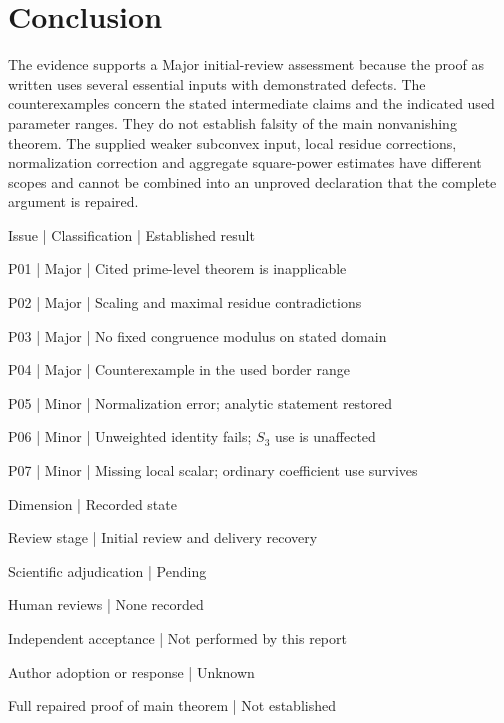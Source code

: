 \documentclass[10pt]{article}
\begin{document}
\section*{Conclusion}
The evidence supports a Major initial-review assessment because the proof as written uses several essential inputs with demonstrated defects. The counterexamples concern the stated intermediate claims and the indicated used parameter ranges. They do not establish falsity of the main nonvanishing theorem. The supplied weaker subconvex input, local residue corrections, normalization correction and aggregate square-power estimates have different scopes and cannot be combined into an unproved declaration that the complete argument is repaired.\par
Issue | Classification | Established result\par
P01 | Major | Cited prime-level theorem is inapplicable\par
P02 | Major | Scaling and maximal residue contradictions\par
P03 | Major | No fixed congruence modulus on stated domain\par
P04 | Major | Counterexample in the used border range\par
P05 | Minor | Normalization error; analytic statement restored\par
P06 | Minor | Unweighted identity fails; \(S_3\) use is unaffected\par
P07 | Minor | Missing local scalar; ordinary coefficient use survives\par
Dimension | Recorded state\par
Review stage | Initial review and delivery recovery\par
Scientific adjudication | Pending\par
Human reviews | None recorded\par
Independent acceptance | Not performed by this report\par
Author adoption or response | Unknown\par
Full repaired proof of main theorem | Not established\par
\end{document}
